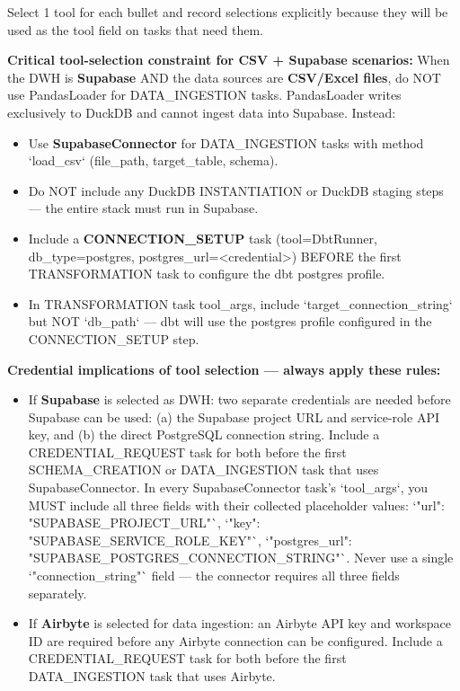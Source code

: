 Select 1 tool for each bullet and record selections explicitly because they will be used as the tool field on tasks that need them.
\newline

\textbf{Critical tool-selection constraint for CSV + Supabase scenarios:} When the DWH is \textbf{Supabase} AND the data sources are \textbf{CSV/Excel files}, do NOT use PandasLoader for DATA\_INGESTION tasks. PandasLoader writes exclusively to DuckDB and cannot ingest data into Supabase. Instead:
\begin{itemize}
    \item Use \textbf{SupabaseConnector} for DATA\_INGESTION tasks with method `load\_csv` (file\_path, target\_table, schema).
    \item Do NOT include any DuckDB INSTANTIATION or DuckDB staging steps — the entire stack must run in Supabase.
    \item Include a \textbf{CONNECTION\_SETUP} task (tool=DbtRunner, db\_type=postgres, postgres\_url=<credential>) BEFORE the first TRANSFORMATION task to configure the dbt postgres profile.
    \item In TRANSFORMATION task tool\_args, include `target\_connection\_string` but NOT `db\_path` — dbt will use the postgres profile configured in the CONNECTION\_SETUP step.
\end{itemize}

\textbf{Credential implications of tool selection — always apply these rules:}
\begin{itemize}
    \item If \textbf{Supabase} is selected as DWH: two separate credentials are needed before Supabase can be used: (a) the Supabase project URL and service-role API key, and (b) the direct PostgreSQL connection string. Include a CREDENTIAL\_REQUEST task for both before the first SCHEMA\_CREATION or DATA\_INGESTION task that uses SupabaseConnector. In every SupabaseConnector task's `tool\_args`, you MUST include all three fields with their collected placeholder values: `"url": "SUPABASE\_PROJECT\_URL"`, `"key": "SUPABASE\_SERVICE\_ROLE\_KEY"`, `"postgres\_url": "SUPABASE\_POSTGRES\_CONNECTION\_STRING"`. Never use a single `"connection\_string"` field — the connector requires all three fields separately.
    \item If \textbf{Airbyte} is selected for data ingestion: an Airbyte API key and workspace ID are required before any Airbyte connection can be configured. Include a CREDENTIAL\_REQUEST task for both before the first DATA\_INGESTION task that uses Airbyte.
\end{itemize}

